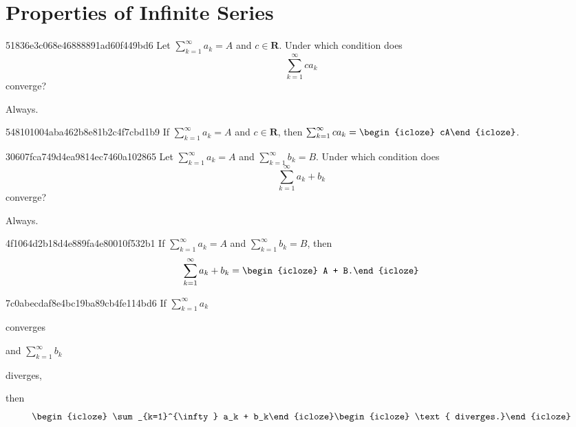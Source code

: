 \section{Properties of Infinite Series} %
\begin{note}{51836e3c068e46888891ad60f449bd6}
    Let \({ \sum_{k=1}^{\infty} a_k = A }\) and \({ c \in \mathbf{R} }\).
    Under which condition does
    \[
        \sum_{k=1}^{\infty} ca_k
    \]
    converge?

    \begin{cloze}{1}
        Always.
    \end{cloze}
\end{note}

\begin{note}{548101004aba462b8e81b2c4f7cbd1b9}
    If \({ \sum_{k=1}^{\infty} a_k = A }\) and \({ c \in \mathbf{R} }\), then \({ \sum_{k=1}^{\infty} ca_k = \begin{icloze}{1}cA\end{icloze} }\).
\end{note}

\begin{note}{30607fca749d4ea9814ec7460a102865}
    Let \({ \sum_{k=1}^{\infty} a_k = A }\) and \({ \sum_{k=1}^{\infty} b_k = B }\).
    Under which condition does
    \[
        \sum_{k=1}^{\infty} a_k + b_k
    \]
    converge?

    \begin{cloze}{1}
        Always.
    \end{cloze}
\end{note}

\begin{note}{4f1064d2b18d4e889fa4e80010f532b1}
    If \({ \sum_{k=1}^{\infty} a_k = A }\) and \({ \sum_{k=1}^{\infty} b_k = B }\), then
    \[
        \sum_{k=1}^{\infty} a_k + b_k = \begin{icloze}{1}A + B.\end{icloze}
    \]
\end{note}

\begin{note}{7c0abecdaf8e4bc19ba89cb4fe114bd6}
    If \({ \sum_{k=1}^{\infty} a_k }\) \begin{icloze}{3}converges\end{icloze} and \({ \sum_{k=1}^{\infty} b_k }\) \begin{icloze}{3}diverges,\end{icloze} then
    \[
        \begin{icloze}{2}\sum_{k=1}^{\infty} a_k + b_k\end{icloze} \begin{icloze}{1}\text{ diverges.}\end{icloze}
    \]
\end{note}

